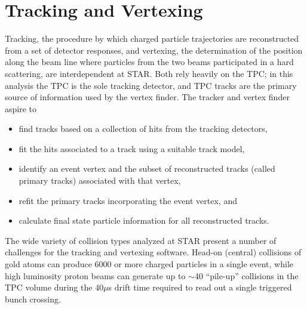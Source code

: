 \section{Tracking and Vertexing}

Tracking, the procedure by which charged particle trajectories are reconstructed from a set of detector responses, and vertexing, the determination of the position along the beam line where particles from the two beams participated in a hard scattering, are interdependent at STAR. Both rely heavily on the TPC; in this analysis the TPC is the sole tracking detector, and TPC tracks are the primary source of information used by the vertex finder.  The tracker \cite{Rose:2003wx} and vertex finder \cite{vertex-finder-starnote} aspire to
%
\begin{itemize}
  \item find tracks based on a collection of hits from the tracking detectors,
  \item fit the hits associated to a track using a suitable track model,
  \item identify an event vertex and the subset of reconstructed tracks (called primary tracks) associated with that vertex,
  \item refit the primary tracks incorporating the event vertex, and
  \item calculate final state particle information for all reconstructed tracks.
\end{itemize}
%
The wide variety of collision types analyzed at STAR present a number of challenges for the tracking and vertexing software.  Head-on (central) collisions of gold atoms can produce 6000 or more charged particles in a single event, while high luminosity proton beams can generate up to $\sim$40 ``pile-up'' collisions in the TPC volume during the 40$\mu$s drift time required to read out a single triggered bunch crossing.

